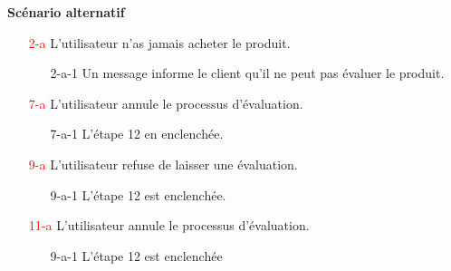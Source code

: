 \documentclass[16pt]{report}
\begin{document}
\textbf{Scénario alternatif}
\begin{enumerate}
    \item[\textcolor{red}{2-a}] L'utilisateur n’as jamais acheter le produit.  
        \begin{enumerate}
            \item[2-a-1] Un message informe le client qu’il ne peut pas évaluer le produit.
        \end{enumerate}
        
        \item[\textcolor{red}{7-a}] L’utilisateur annule le processus d’évaluation.
        \begin{enumerate}
            \item[7-a-1] L’étape 12 en enclenchée.
        \end{enumerate} 

        \item[\textcolor{red}{9-a}] L’utilisateur refuse de laisser une évaluation.
        \begin{enumerate}
            \item[9-a-1] L’étape 12 est enclenchée.
        \end{enumerate}

        \item[\textcolor{red}{11-a}] L’utilisateur annule le processus d’évaluation.
        \begin{enumerate}
            \item[9-a-1] L’étape 12 est enclenchée
        \end{enumerate}




\end{enumerate}
\end{document}
